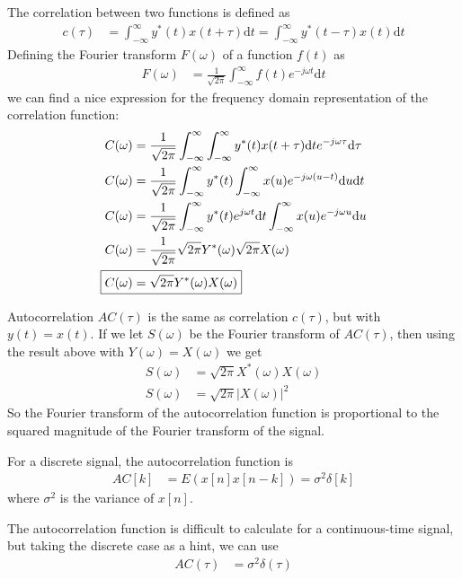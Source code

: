 \documentclass[twocolumn]{myarticle}
\renewcommand{\d}{\mathrm{d}}
\begin{document}
The correlation between two functions is defined as
\begin{align}
    c(\tau) &= \int_{-\infty}^{\infty} y^*(t) x(t + \tau) \d t = \int_{-\infty}^{\infty} y^*(t - \tau) x(t) \d t
\end{align}
Defining the Fourier transform $ F(\omega) $ of a function $ f(t) $ as
\begin{align}
    F(\omega) &= \frac{1}{\sqrt{2 \pi}} \int_{-\infty}^{\infty} f(t) e^{-j\omega t} \d t
\end{align}
we can find a nice expression for the frequency domain representation of the correlation function:
\begin{align}
    C(\omega) &= \frac{1}{\sqrt{2\pi}} \int_{-\infty}^{\infty} \int_{-\infty}^{\infty} y^*(t) x(t + \tau) \d t e^{-j \omega \tau} \d \tau
    \\
    C(\omega) &= \frac{1}{\sqrt{2\pi}} \int_{-\infty}^{\infty} y^*(t) \int_{-\infty}^{\infty} x(u) e^{-j \omega (u - t)} \d u \d t
    \\
    C(\omega) &= \frac{1}{\sqrt{2\pi}} \int_{-\infty}^{\infty} y^*(t) e^{j \omega t} \d t \int_{-\infty}^{\infty} x(u) e^{-j \omega u} \d u
    \\
    C(\omega) &= \frac{1}{\sqrt{2\pi}} \sqrt{2 \pi} Y^*(\omega) \sqrt{2 \pi} X(\omega) 
    \\
    \Aboxed{C(\omega) &= \sqrt{2 \pi} Y^*(\omega) X(\omega) }
\end{align}

Autocorrelation $ AC(\tau) $ is the same as correlation $ c(\tau) $, but with $ y(t) = x(t) $.
If we let $ S(\omega) $ be the Fourier transform of $ AC(\tau) $, then using the result above with $ Y(\omega) = X(\omega) $ we get
\begin{align}
    S(\omega) &= \sqrt{2 \pi} X^*(\omega) X(\omega)
    \\
    S(\omega) &= \sqrt{2 \pi} \left| X(\omega) \right|^2
\end{align}
So the Fourier transform of the autocorrelation function is proportional to the squared magnitude of the Fourier transform of the signal.

For a discrete signal, the autocorrelation function is
\begin{align}
    AC[k] &= E \left( x[n] x[n-k] \right) = \sigma^2 \delta[k]
\end{align}
where $ \sigma^2 $ is the variance of $ x[n] $.

The autocorrelation function is difficult to calculate for a continuous-time signal, but taking the discrete case as a hint, we can use
\begin{align}
    AC(\tau) &= \sigma^2 \delta(\tau)
\end{align}
\end{document}
